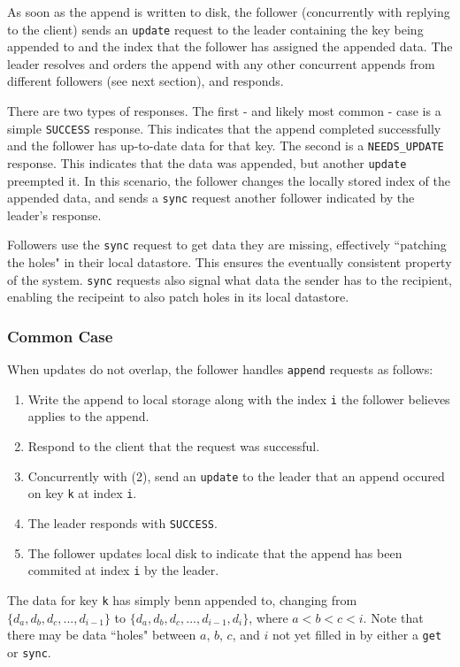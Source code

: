 \documentclass[11pt,english,twocolumn]{article}
\begin{document}
As soon as the append is written to disk, the follower (concurrently with
replying to the client) sends an \texttt{update} request to the leader
containing the key being appended to and the index that the follower has
assigned the appended data. The leader resolves and orders the append with any
other concurrent appends from different followers (see next section), and
responds.

There are two types of responses. The first - and likely most common - case
is a simple \texttt{SUCCESS} response. This indicates that the append completed
successfully and the follower has up-to-date data for that key. The second is a
\texttt{NEEDS\_UPDATE} response. This indicates that the data was appended, but
another \texttt{update} preempted it. In this scenario, the follower changes the
locally stored index of the appended data, and sends a \texttt{sync} request
another follower indicated by the leader's response.

Followers use the \texttt{sync} request to get data they are missing,
effectively ``patching the holes" in their local datastore. This ensures the
eventually consistent property of the system. \texttt{sync} requests also signal
what data the sender has to the recipient, enabling the recipeint to also patch
holes in its local datastore.

\subsubsection{Common Case}
When updates do not overlap, the follower handles \texttt{append} requests as
follows:

\begin{enumerate}
	\item Write the append to local storage along with the index \texttt{i}
		the follower believes applies to the append.
	\item Respond to the client that the request was successful.
	\item Concurrently with (2), send an \texttt{update} to the leader that
		an append occured on key \texttt{k} at index \texttt{i}.
	\item The leader responds with \texttt{SUCCESS}.
	\item The follower updates local disk to indicate that the append has
		been commited at index \texttt{i} by the leader.
\end{enumerate}

The data for key \texttt{k} has simply benn appended to, changing from $\{d_a,
d_b, d_c, ..., d_{i-1}\}$ to $\{d_a, d_b, d_c, ..., d_{i-1}, d_i\}$, where $a < b <
c < i$. Note that there may be data ``holes" between $a$, $b$, $c$, and $i$ not
yet filled in by either a \texttt{get} or \texttt{sync}.
\end{document}

